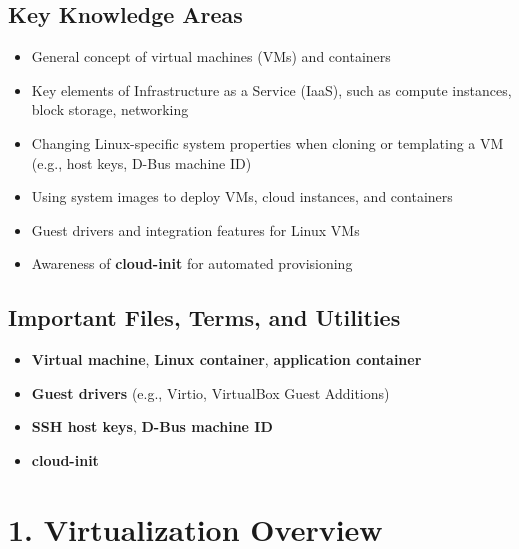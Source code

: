 \documentclass[12pt,a4paper]{report}
\begin{document}
\subsection*{Key Knowledge Areas}
\begin{itemize}
    \item General concept of virtual machines (VMs) and containers
    \item Key elements of Infrastructure as a Service (IaaS), such as compute instances, block storage, networking
    \item Changing Linux-specific system properties when cloning or templating a VM (e.g., host keys, D-Bus machine ID)
    \item Using system images to deploy VMs, cloud instances, and containers
    \item Guest drivers and integration features for Linux VMs
    \item Awareness of \textbf{cloud-init} for automated provisioning
\end{itemize}

\subsection*{Important Files, Terms, and Utilities}
\begin{itemize}
    \item \textbf{Virtual machine}, \textbf{Linux container}, \textbf{application container}
    \item \textbf{Guest drivers} (e.g., Virtio, VirtualBox Guest Additions)
    \item \textbf{SSH host keys}, \textbf{D-Bus machine ID}
    \item \textbf{cloud-init}
\end{itemize}

\section*{1. Virtualization Overview}
\end{document}

